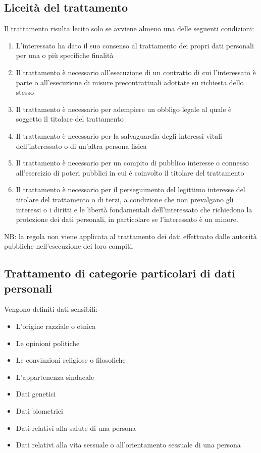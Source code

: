 \subsection{Liceità del trattamento}
\label{sec:liceità}
Il trattamento risulta lecito solo se avviene almeno una delle seguenti condizioni:
\begin{enumerate}
    \item L'interessato ha dato il suo consenso al trattamento dei propri dati
        personali per una o più specifiche finalità
    \item Il trattamento è necessario all'esecuzione di un contratto di cui
        l'interessato è parte o all'esecuzione di misure precontrattuali
        adottate su richiesta dello stesso
    \item Il trattamento è necessario per adempiere un obbligo legale al quale
        è soggetto il titolare del trattamento
    \item Il trattamento è necessario per la salvaguardia degli interessi
        vitali dell'interessato o di un'altra persona fisica
    \item Il trattamento è necessario per un compito di pubblico interesse o
        connesso all'esercizio di poteri pubblici in cui è coinvolto il
        titolare del trattamento
    \item Il trattamento è necessario per il perseguimento del legittimo
        interesse del titolare del trattamento o di terzi, a condizione che non
        prevalgano gli interessi o i diritti e le libertà fondamentali
        dell'interessato che richiedono la protezione dei dati personali, in
        particolare se l'interessato è un minore.
\end{enumerate}
NB: la regola non viene applicata al trattamento dei dati effettuato dalle
autorità pubbliche nell'esecuzione dei loro compiti.

\subsection{Trattamento di categorie particolari di dati personali}

Vengono definiti dati sensibili:
\begin{itemize}
    \item L'origine razziale o etnica
    \item Le opinioni politiche
    \item Le convinzioni religiose o filosofiche
    \item L'appartenenza sindacale
    \item Dati genetici
    \item Dati biometrici
    \item Dati relativi alla salute di una persona
    \item Dati relativi alla vita sessuale o all'orientamento sessuale di una persona

\end{itemize}

